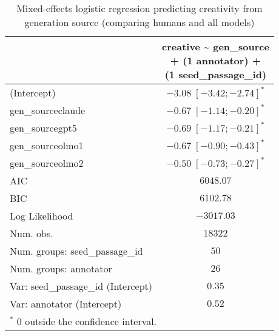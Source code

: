 
\usepackage{booktabs}

\begin{table}[htbp]
\begin{center}
\begin{tabular}{l c}
\toprule
 & \shortstack[l]{creative \textasciitilde{} gen\_source  \\ 
+ (1 \textbar{} annotator) + \\ 
(1 \textbar{} seed\_passage\_id)} \\
\midrule
(Intercept)                        & $-3.08 \; [-3.42; -2.74]^{*}$ \\
gen\_sourceclaude                  & $-0.67 \; [-1.14; -0.20]^{*}$ \\
gen\_sourcegpt5                    & $-0.69 \; [-1.17; -0.21]^{*}$ \\
gen\_sourceolmo1                   & $-0.67 \; [-0.90; -0.43]^{*}$ \\
gen\_sourceolmo2                   & $-0.50 \; [-0.73; -0.27]^{*}$ \\
\midrule
AIC                                & $6048.07$                     \\
BIC                                & $6102.78$                     \\
Log Likelihood                     & $-3017.03$                    \\
Num. obs.                          & $18322$                       \\
Num. groups: seed\_passage\_id     & $50$                          \\
Num. groups: annotator             & $26$                          \\
Var: seed\_passage\_id (Intercept) & $0.35$                        \\
Var: annotator (Intercept)         & $0.52$                        \\
\bottomrule
\multicolumn{2}{l}{\scriptsize{$^*$ 0 outside the confidence interval.}}
\end{tabular}
\caption{Mixed-effects logistic regression predicting creativity from generation source (comparing humans and all models)}
\label{tab:glmer_nov_src_front}
\end{center}
\end{table}

